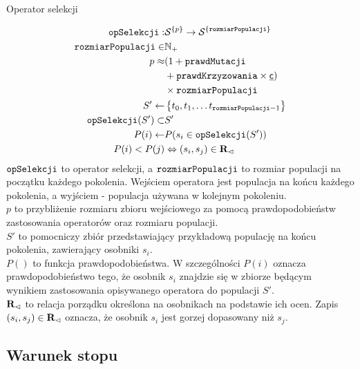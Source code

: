 \documentclass[./FM_mgr.tex]{subfiles}
\begin{document}
\begin{signature}
	\caption{Operator selekcji \label{signature:selection}}
	\begin{align}
		\mathtt{opSelekcji}: &{\mathcal{S}}^{ \{ p \}} \rightarrow {\mathcal{S}}^{ \{ \mathtt{rozmiarPopulacji} \}} \\
		\mathtt{rozmiarPopulacji} \in &\mathbb{N}_{+} \\
		\label{line:p_start} 
		p \approx &(1 + \mathtt{prawdMutacji} \\
		&+ \mathtt{prawdKrzyzowania} \times \mathsf{\underline{c}}) \\
		\label{line:p_stop} 
		&\times \mathtt{rozmiarPopulacji} \\
		\label{line:constraint_sel_start}          
		S' \gets &\left\{ t_0, t_1, \ldots t_{\mathtt{rozmiarPopulacji}-1} \right\} \\
		\mathtt{opSelekcji}(S') \subset &S'\\
		P(i) \gets &P(s_i \in \mathtt{opSelekcji}(S')) \\
		\label{line:constraint_sel_stop} 
		P(i) < P(j) &\Leftrightarrow (s_i, s_j) \in {\mathbf{R}}_{\lhd}
	\end{align}
	$\mathtt{opSelekcji}$ to operator selekcji, a $\mathtt{rozmiarPopulacji}$ to rozmiar populacji na początku każdego pokolenia.
	Wejściem operatora jest populacja na końcu każdego pokolenia, a wyjściem - populacja używana w kolejnym pokoleniu. \\
	$p$ to przybliżenie rozmiaru zbioru wejściowego za pomocą prawdopodobieństw zastosowania operatorów oraz rozmiaru populacji.\\
	$S'$ to pomocniczy zbiór przedstawiający przykładową populację na końcu pokolenia, zawierający osobniki $s_i$. \\
	$P()$ to funkcja prawdopodobieństwa. 
	W szczególności $P(i)$ oznacza prawdopodobieństwo tego, że osobnik $s_i$ znajdzie się w zbiorze będącym wynikiem zastosowania opisywanego operatora do populacji $S'$.\\
	${\mathbf{R}}_{\lhd}$ to relacja porządku określona na osobnikach na podstawie ich ocen. Zapis $(s_i, s_j) \in {\mathbf{R}}_{\lhd}$ oznacza, że osobnik $s_i$ jest gorzej dopasowany niż $s_j$.
	
\end{signature}

\subsection{Warunek stopu} \label{subsection:stop}
\end{document}
